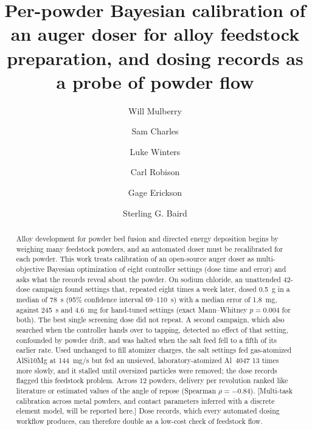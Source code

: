 \documentclass[preprint,12pt]{elsarticle}
\newcommand{\ph}[1]{\textcolor{orange!75!black}{\textsf{[#1]}}}
\begin{document}
\begin{frontmatter}

\title{Per-powder Bayesian calibration of an auger doser for alloy feedstock preparation, and dosing records as a probe of powder flow}

\author[byu]{Will Mulberry}
\author[byu]{Sam Charles}
\author[byu]{Luke Winters}
\author[byu]{Carl Robison}
\author[byu]{Gage Erickson}
\author[byu,ac]{Sterling G. Baird}


\begin{abstract}
Alloy development for powder bed fusion and directed energy deposition begins by weighing many feedstock powders, and an automated doser must be recalibrated for each powder.
This work treats calibration of an open-source auger doser as multi-objective Bayesian optimization of eight controller settings (dose time and error) and asks what the records reveal about the powder.
On sodium chloride, an unattended 42-dose campaign found settings that, repeated eight times a week later, dosed 0.5~g in a median of 78~s (95\% confidence interval 69--110~s) with a median error of 1.8~mg, against 245~s and 4.6~mg for hand-tuned settings (exact Mann--Whitney $p = 0.004$ for both).
The best single screening dose did not repeat.
A second campaign, which also searched when the controller hands over to tapping, detected no effect of that setting, confounded by powder drift, and was halted when the salt feed fell to a fifth of its earlier rate.
Used unchanged to fill atomizer charges, the salt settings fed gas-atomized AlSi10Mg at 144~mg/s but fed an unsieved, laboratory-atomized Al~4047 13 times more slowly, and it stalled until oversized particles were removed; the dose records flagged this feedstock problem.
Across 12 powders, delivery per revolution ranked like literature or estimated values of the angle of repose (Spearman $\rho = -0.84$).
\ph{Multi-task calibration across metal powders, and contact parameters inferred with a discrete element model, will be reported here.}
Dose records, which every automated dosing workflow produces, can therefore double as a low-cost check of feedstock flow.
\end{abstract}


\end{frontmatter}
\end{document}
